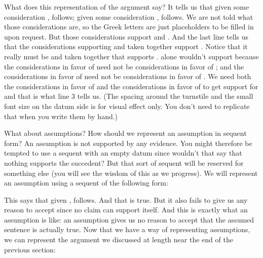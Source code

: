 What does this representation of the argument say? It tells us that given some 
consideration \p{\Gamma},  follows; given some consideration \p{\Delta},  
 follows. We are not told what those considerations are, so the 
Greek letters are just placeholders to be filled in upon request. But those 
considerations support  and .  And the last line tells us 
that the considerations supporting  and  taken together 
support .  Notice that it really must be \p{\Gamma} and \p{\Delta} taken 
together that supports .  \p{\Gamma} alone wouldn't support  because 
the considerations in favor of  need not be considerations in favor of 
; and the considerations in favor of  need not 
be considerations in favor of . We need both the considerations in favor of 
 and the considerations in favor of  to get support for 
 and that is what line 3 tells us.
(The spacing around the turnstile and the small font size on the datum side is 
for visual effect only. You don't need to replicate that when you write them by 
hand.)

What about assumptions? How should we represent an assumption in sequent form?  
An assumption is not supported by any evidence. You might therefore be tempted 
to use a sequent with an empty datum since wouldn't that say that nothing 
supports the succedent? But that sort of sequent will be reserved for something 
else (you will see the wisdom of this as we progress).  We will represent an 
assumption using a sequent of the following form:

\begin{center}
\end{center}

This says that given ,  follows.  And that is true. But it also fails 
to give us any reason to accept  since no claim can support itself. And 
this is exactly what an assumption is like: an assumption gives us no reason to 
accept that the assumed sentence is actually true. Now that we have a way of 
representing assumptions, we can represent the argument we discussed at length 
near the end of the previous section:

\begin{argument}

 \aitem {}

 \aitem {}

 \aitem {}

 \aitem {}

 \aitem {}

 \aitem {}

\end{argument}

